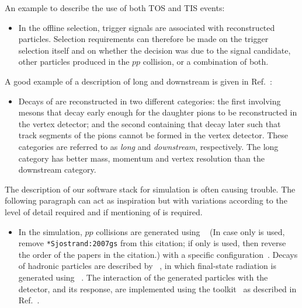 An example to describe the use of both TOS and TIS events:
\begin{itemize}
\item In the offline selection, trigger signals are associated with reconstructed particles.
Selection requirements can therefore be made on the trigger selection itself
and on whether the decision was due to the signal candidate, other particles produced in the $pp$ collision, or a combination of both.
\end{itemize}

A good example of a description of long and downstream \KS is given in 
Ref.~\cite{LHCb-PAPER-2014-006}:
\begin{itemize}
\item
Decays of \decay{\KS}{\pip\pim} are reconstructed in two different categories:
the first involving \KS mesons that decay early enough for the
daughter pions to be reconstructed in the vertex detector; and the
second containing \KS that decay later such that track segments of the
pions cannot be formed in the vertex detector. These categories are
referred to as \emph{long} and \emph{downstream}, respectively. The
long category has better mass, momentum and vertex resolution than the
downstream category.
\end{itemize}

The description of our software stack for simulation is often
causing trouble. The following paragraph can act as inspiration but
with variations according to the level of detail required and if
mentioning of \eg \photos is required.
\begin{itemize}
\item In the simulation, $pp$ collisions are generated using
\pythia~\cite{Sjostrand:2006za,*Sjostrand:2007gs} 
(In case only  is used, remove \verb=*Sjostrand:2007gs= from this citation; if 
only  is used, then reverse the order of the papers in the citation.)
 with a specific \lhcb
configuration~\cite{LHCb-PROC-2010-056}.  Decays of hadronic particles
are described by \evtgen~\cite{Lange:2001uf}, in which final-state
radiation is generated using \photos~\cite{Golonka:2005pn}. The
interaction of the generated particles with the detector, and its response,
are implemented using the \geant
toolkit~\cite{Allison:2006ve, *Agostinelli:2002hh} as described in
Ref.~\cite{LHCb-PROC-2011-006}.
\end{itemize}

